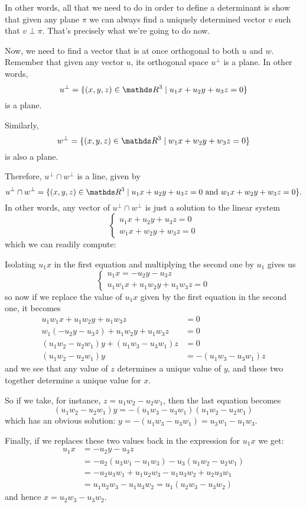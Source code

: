 In other words, all that we need to do in order to define a determinant is show that given any plane $\pi$ we can always find a uniquely determined vector $v$ such that $v\perp \pi$. That's precisely what we're going to do now.

Now, we need to find a vector that is at once orthogonal to both $u$ and $w$. Remember that given any vector $u$, its orthogonal space $u^\perp$ is a plane. In other words, 
\[u^\perp=\{(x,y,z)\in \R^3\mid u_1x+u_2y+u_3z=0\}\]is a plane.

Similarly, 
\[w^\perp=\{(x,y,z)\in \R^3\mid w_1x+w_2y+w_3z=0\}\]is also a plane.

Therefore, $u^\perp\cap w^\perp$ is a line, given by
\[u^\perp\cap w^\perp=\{(x,y,z)\in\R^3\mid u_1x+u_2y+u_3z=0\mbox{ and }w_1x+w_2y+w_3z=0\}.\]In other words, any vector of $u^\perp\cap w^\perp$ is just a solution to the linear system
\[\begin{cases}
u_1x+u_2y+u_3z=0\\
w_1x+w_2y+w_3z=0
\end{cases}\]which we can readily compute:

Isolating $u_1x$ in the first equation and multiplying the second one by $u_1$ gives us
\[\begin{cases}
u_1x=-u_2y-u_3z\\
u_1w_1x+u_1w_2y+u_1w_3z=0
\end{cases}\]so now if we replace the value of $u_1x$ given by the first equation in the second one, it becomes
\begin{align*}
	u_1w_1x+u_1w_2y+u_1w_3z&=0\\
	w_1(-u_2y-u_3z)+u_1w_2y+u_1w_3z&=0\\
	(u_1w_2-u_2w_1)y+(u_1w_3-u_3w_1)z&=0\\
	(u_1w_2-u_2w_1)y&=-(u_1w_3-u_3w_1)z
\end{align*}and we see that any value of $z$ determines a unique value of $y$, and these two together determine a unique value for $x$.

So if we take, for instance, $z=u_1w_2-u_2w_1$, then the last equation becomes
\[(u_1w_2-u_2w_1)y=-(u_1w_3-u_3w_1)(u_1w_2-u_2w_1)\]which has an obvious solution: $y=-(u_1w_3-u_3w_1)=u_3w_1-u_1w_3$.

Finally, if we replaces these two values back in the expression for $u_1x$ we get:
\begin{align*}
	u_1x&=-u_2y-u_3z\\
	&=-u_2(u_3w_1-u_1w_3)-u_3(u_1w_2-u_2w_1)\\
	&=-u_2u_3w_1+u_1u_2w_3-u_1u_3w_2+u_2u_3w_1\\
	&=u_1u_2w_3-u_1u_3w_2=u_1(u_2w_3-u_3w_2)
\end{align*}and hence $x=u_2w_3-u_3w_2$.

